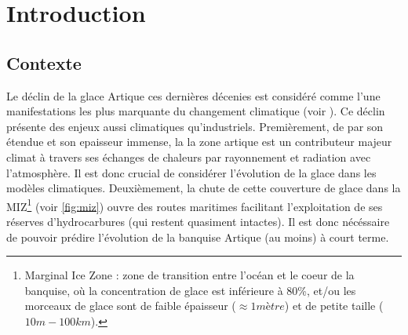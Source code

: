 
\chapter{Introduction} %

\label{Chapter1} %


\newcommand{\keyword}[1]{\textbf{#1}}
\newcommand{\tabhead}[1]{\textbf{#1}}
\newcommand{\code}[1]{\texttt{#1}}
\newcommand{\file}[1]{\texttt{\bfseries#1}}
\newcommand{\option}[1]{\texttt{\itshape#1}}









\section{Contexte}



Le déclin de la glace Artique ces dernières décenies est considéré comme l'une manifestations les plus marquante du changement climatique (voir \parencite{stroeve2012trends}). Ce déclin présente des enjeux aussi climatiques qu'industriels. Premièrement, de par son étendue et son epaisseur immense, la la zone artique est un contributeur majeur climat à travers ses échanges de chaleurs par rayonnement et radiation avec l'atmosphère. Il est donc crucial de considérer l'évolution de la glace dans les modèles climatiques. Deuxièmement, la chute de cette couverture de glace dans la MIZ\footnote{Marginal Ice Zone : zone de transition entre l’océan et le coeur de la banquise, où la concentration de
glace est inférieure à 80\%, et/ou les morceaux de glace sont de faible épaisseur ($\approx 1 mètre$) et de petite taille ($10 m - 100 km$).} (voir \cref{fig:miz}) ouvre des routes maritimes facilitant l'exploitation de ses réserves d’hydrocarbures (qui restent quasiment intactes). Il est donc nécéssaire de pouvoir prédire l'évolution de la banquise Artique (au moins) à court terme.


